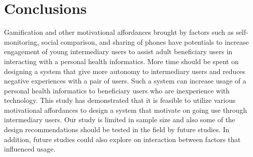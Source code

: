 \documentclass{sig-alternate}
\begin{document}
\section{Conclusions}
Gamification and other motivational affordances brought by factors such as self-monitoring, social comparison, and sharing of phones have potentials to increase engagement of young intermediary users to assist adult beneficiary users in interacting with a personal health informatics. More time should be spent on designing a system that give more autonomy to intermediary users and reduces negative experiences with a pair of users. Such a system can increase usage of a personal health informatics to beneficiary users who are inexperience with technology. This study has demonstrated that it is feasible to utilize various motivational affordances to design a system that motivate on going use through intermediary users. Our study is limited in sample size and also some of the design recommendations should be tested in the field by future studies. In addition, future studies could also explore on interaction between factors that influenced usage.  



%

%
%
\end{document}
